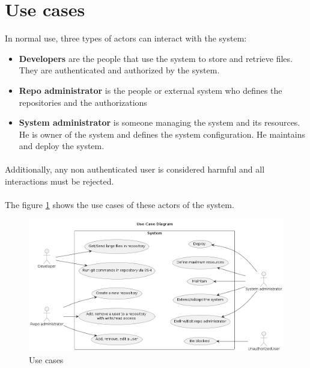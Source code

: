 \newpage
\section{Use cases}

In normal use, three types of actors can interact with the system:

\begin{itemize}
    \item \textbf{Developers} are the people that use the system to store and retrieve files. They are authenticated and authorized by the system.
    \item \textbf{Repo administrator} is the people or external system who defines the repositories and the authorizations
    \item \textbf{System administrator} is someone managing the system and its resources. He is owner of the system and defines the system configuration. He maintains and deploy the system.
\end{itemize}

\paragraph{}
Additionally, any non authenticated user is considered harmful and all interactions must be rejected.

\paragraph{}
The figure \ref{fig:use_cases} shows the use cases of these actors of the system. 

\begin{figure}[h]
    \centering
    \includegraphics[width=\textwidth]{design/diagrams/use_cases.png}
    \caption{Use cases}
    \label{fig:use_cases}
\end{figure}

